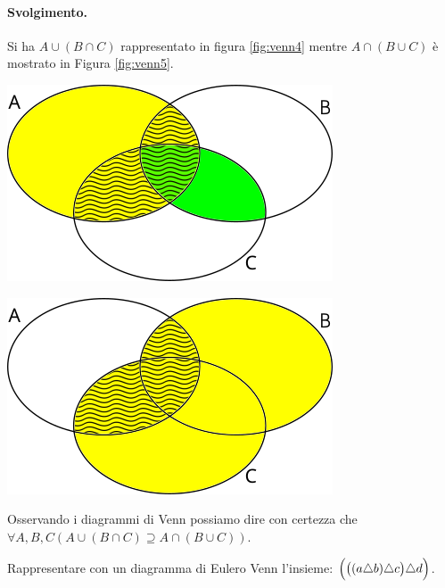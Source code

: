 \paragraph{Svolgimento.}
Si ha $A \cup (B \cap C)$ rappresentato in figura \ref{fig:venn4} mentre $A \cap (B \cup C)$ è mostrato in Figura \ref{fig:venn5}.
\begin{center}
	\begin{minipage}{.45\textwidth}
		\centering
		\includegraphics[scale=.6]{res/Venn_Esercizio4.png}
		\label{fig:venn4}
	\end{minipage}
	\hfil
	\begin{minipage}{.45\textwidth}
		\centering
		\includegraphics[scale=.6]{res/Venn_Esercizio5.png}
		\label{fig:venn5}
	\end{minipage}
\end{center}
Osservando i diagrammi di Venn possiamo dire con certezza che $\forall A,B,C (A \cup (B \cap C) \supseteq A \cap (B \cup C))$. \hfill \blacksquare
\begin{exsbox}
	Rappresentare con un diagramma di Eulero Venn l'insieme: $\Bigl( \bigl(   (a \triangle b) \triangle c \bigr) \triangle d \Bigr)$.
\end{exsbox}
